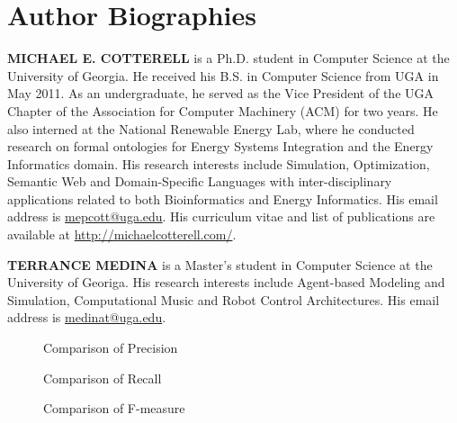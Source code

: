 \documentclass[letterpaper,twocolumn,12pt]{article}
\begin{document}
\section*{Author Biographies} 
\vspace{8 pt}
\noindent \textbf{MICHAEL E. COTTERELL} is a Ph.D. student in Computer Science at the University of Georgia. 
He received his B.S. in Computer Science from UGA in May 2011. 
As an undergraduate, he served as the Vice President of the UGA Chapter of the Association for Computer Machinery (ACM) for two years. 
He also interned at the National Renewable Energy Lab, where he conducted research on formal ontologies for Energy Systems Integration and the Energy Informatics domain. 
His research interests include Simulation, Optimization, Semantic Web and Domain-Specific Languages with inter-disciplinary applications related to both Bioinformatics and Energy Informatics.
His email address is \href{mailto:mepcott@uga.edu}{mepcott@uga.edu}.
His curriculum vitae and list of publications are available at \url{http://michaelcotterell.com/}.

\vspace{8 pt}
\noindent \textbf{TERRANCE MEDINA} is a Master's student in Computer Science at the University of Georiga.  
His research interests include Agent-based Modeling and Simulation, Computational Music and Robot Control Architectures.
His email address is \href{mailto:medinat@uga.edu}{medinat@uga.edu}.




\onecolumn
\begin{sidewaysfigure}
\centering
\tiny{}
\caption{Comparison of Precision}
\label{fig:precision}
\end{sidewaysfigure}

\begin{sidewaysfigure}
\centering
\tiny{}
\caption{Comparison of Recall}
\label{fig:recall}
\end{sidewaysfigure}

\begin{sidewaysfigure}
\centering
\tiny{}
\caption{Comparison of F-measure}
\label{fig:fmeasure}
\end{sidewaysfigure}
\end{document}
